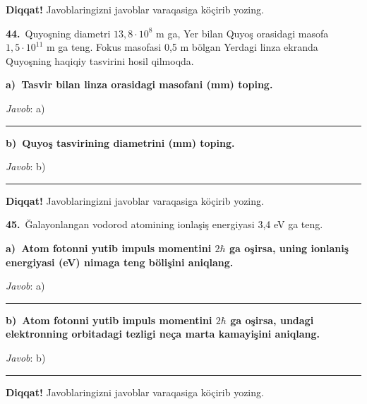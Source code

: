 \documentclass[11pt,a4paper]{article}
\newcommand{\blank}{\rule{5cm}{0.4pt}}
\begin{document}
\medskip\noindent\textbf{Diqqat!} Javoblaringizni javoblar varaqasiga köçirib yozing.\par\vspace{10pt}
\noindent\textbf{44.}\ Quyoşning diametri $13,8\cdot10^{8}$ m ga, Yer bilan Quyoş orasidagi masofa $1,5\cdot10^{11}$ m ga teng. Fokus masofasi 0,5 m bölgan Yerdagi linza ekranda Quyoşning haqiqiy tasvirini hosil qilmoqda.\par\smallskip
\medskip\noindent\textbf{a)\ Tasvir bilan linza orasidagi masofani (mm) toping.}\par
\noindent\textit{Javob}: a)\ \blank\par
\medskip\noindent\textbf{b)\ Quyoş tasvirining diametrini (mm) toping.}\par
\noindent\textit{Javob}: b)\ \blank\par
\medskip\noindent\textbf{Diqqat!} Javoblaringizni javoblar varaqasiga köçirib yozing.\par\vspace{10pt}
\noindent\textbf{45.}\ Ğalayonlangan vodorod atomining ionlaşiş energiyasi 3,4 eV ga teng.\par\smallskip
\medskip\noindent\textbf{a)\ Atom fotonni yutib impuls momentini $2\hbar$ ga oşirsa, uning ionlaniş energiyasi (eV) nimaga teng bölişini aniqlang.}\par
\noindent\textit{Javob}: a)\ \blank\par
\medskip\noindent\textbf{b)\ Atom fotonni yutib impuls momentini $2\hbar$ ga oşirsa, undagi elektronning orbitadagi tezligi neça marta kamayişini aniqlang.}\par
\noindent\textit{Javob}: b)\ \blank\par
\medskip\noindent\textbf{Diqqat!} Javoblaringizni javoblar varaqasiga köçirib yozing.\par\vspace{10pt}
\end{document}
